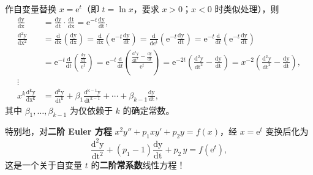 \documentclass[lang=cn,11pt]{elegantbook}
\begin{document}
\begin{theorem}
作自变量替换 $x=\mathrm{e}^t$（即 $t=\ln x$，要求 $x>0$；$x<0$ 时类似处理），则
\begin{align*}
\frac{\mathrm{\mathrm{d}y}}{\mathrm{\mathrm{d}x}}&=\frac{\mathrm{\mathrm{d}y}}{\mathrm{\mathrm{d}t}}\cdot\frac{\mathrm{\mathrm{d}t}}{\mathrm{\mathrm{d}x}}
 =\mathrm{e}^{-t}\frac{\mathrm{\mathrm{d}y}}{\mathrm{\mathrm{d}t}},\\[6pt]
\frac{\mathrm{d^2y}}{\mathrm{\mathrm{d}x^2}}&=\frac{\mathrm{d}}{\mathrm{\mathrm{d}x}}\left(\frac{\mathrm{\mathrm{d}y}}{\mathrm{\mathrm{d}x}}\right)=\frac{\mathrm{d}}{\mathrm{\mathrm{d}x}}\!\left(\mathrm{e}^{-t}\frac{\mathrm{\mathrm{d}y}}{\mathrm{\mathrm{d}t}}\right)=\frac{\mathrm{d}}{\mathrm{d\mathrm{e}^t}}\left(\mathrm{e}^{-t}\frac{\mathrm{\mathrm{d}y}}{\mathrm{\mathrm{d}t}}\right)=\mathrm{e}^{-t}\frac{\mathrm{d}}{\mathrm{d}t}\left(\mathrm{e}^{-t}\frac{\mathrm{\mathrm{d}y}}{\mathrm{\mathrm{d}t}}\right) \\
&=\mathrm{e}^{-t}\frac{\mathrm{d}}{\mathrm{d}t}\left(\frac{\frac{\mathrm{\mathrm{d}y}}{\mathrm{\mathrm{d}t}}}{\mathrm{e}^t}\right)=\mathrm{e}^{-t}\frac{\mathrm{d}}{\mathrm{d}t}\left(\frac{\frac{\mathrm{d^2y}}{\mathrm{dt^2}}-\frac{\mathrm{\mathrm{d}y}}{\mathrm{\mathrm{d}t}}}{\mathrm{e}^t}\right)=\mathrm{e}^{-2t}\!\left(\frac{\mathrm{d^2y}}{\mathrm{dt^2}}-\frac{\mathrm{\mathrm{d}y}}{\mathrm{\mathrm{d}t}}\right)=x^{-2}\left(\frac{\mathrm{d^2y}}{\mathrm{dt^2}}-\frac{\mathrm{\mathrm{d}y}}{\mathrm{\mathrm{d}t}}\right),\\[6pt]
\vdots&\\
x^k\frac{\mathrm{d^ky}}{\mathrm{\mathrm{d}x^k}}
&=\frac{\mathrm{d^ky}}{\mathrm{dt^k}}+\beta_1\frac{\mathrm{d^{k-1}y}}{\mathrm{dt^{k-1}}}+
       \cdots+\beta_{k-1}\frac{\mathrm{\mathrm{d}y}}{\mathrm{\mathrm{d}t}},
\end{align*}
其中 $\beta_1,\dots,\beta_{k-1}$ 为仅依赖于 $k$ 的确定常数。
\end{theorem}
特别地，对\textbf{二阶 Euler 方程}
$x^2y''+p_1xy'+p_2y=f(x)$，经 $x=\mathrm{e}^t$ 变换后化为
\[
\frac{\mathrm{d^2y}}{\mathrm{dt^2}}+(p_1-1)\frac{\mathrm{\mathrm{d}y}}{\mathrm{\mathrm{d}t}}+p_2\,y=f(\mathrm{e}^t),
\]
这是一个关于自变量 $t$ 的\textbf{二阶常系数}线性方程！
\end{document}
